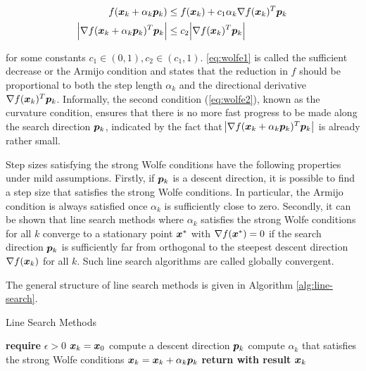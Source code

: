 \begin{align}
    f(\bm{x}_k + \alpha_k \bm{p}_k) &\leq f(\bm{x}_k) + c_1 \alpha_k \nabla f(\bm{x}_k)^T \bm{p}_k \label{eq:wolfe1} \\
    \abs{\nabla f(\bm{x}_k + \alpha_k \bm{p}_k)^T \bm{p}_k} &\leq c_2 \abs{\nabla f(\bm{x}_k)^T \bm{p}_k} \label{eq:wolfe2}
\end{align}

\noindent for some constants $c_1 \in (0, 1), c_2 \in (c_1, 1)$. \autoref{eq:wolfe1} is called the sufficient decrease or the Armijo condition 
and states that the reduction in $f$ should be proportional to both the step length $\alpha_k$ and the directional derivative 
$\nabla f(\bm{x}_k)^T \bm{p}_k$. Informally, the second condition (\cref{eq:wolfe2}), known as the curvature condition, ensures that there 
is no more fast 
progress to be made along the search direction $\bm{p}_k$, indicated by the fact that $\abs{\nabla f(\bm{x}_k + \alpha_k \bm{p}_k)^T
\bm{p}_k}$ is already rather small. 

Step sizes satisfying the strong Wolfe conditions have the following properties under mild assumptions. Firstly, 
if $\bm{p}_k$ is a descent direction, it is possible to find a step size that satisfies the strong Wolfe conditions. In particular,
the Armijo condition is always satisfied once $\alpha_k$ is sufficiently close to zero. Secondly, it 
can be shown that line search methods where $\alpha_k$ satisfies the strong Wolfe conditions for all $k$ converge to a stationary
point $\bm{x}^*$ with $\nabla f(\bm{x}^*) = 0$ if the search direction $\bm{p}_k$ is sufficiently far from orthogonal to the steepest
descent direction $\nabla f(\bm{x}_k)$ for all $k$. Such line search algorithms are called globally convergent.

The general structure of line search methods is given in Algorithm \ref{alg:line-search}.

\begin{algorithm}
\caption{Line Search Methods}\label{alg:line-search}
\begin{algorithmic}
\State \textbf{require } $\epsilon > 0$
\State $\bm{x}_k = \bm{x}_0$
\State compute a descent direction $\bm{p}_k$
\State compute $\alpha_k$ that satisfies the strong Wolfe conditions
\State $\bm{x}_k = \bm{x}_k + \alpha_k \bm{p}_k$
\EndWhile
\State \textbf{return with result } $\bm{x}_k$
\EndProcedure
\end{algorithmic}
\end{algorithm}

